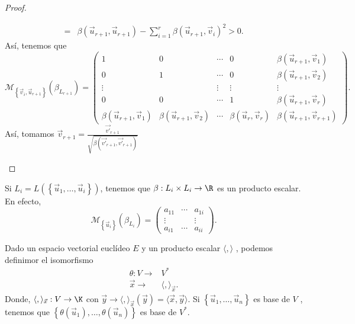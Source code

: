 \begin{proof}
\begin{description}
\[\begin{split}
	= & \beta\left(\vec{u}_{r+1}, \vec{u}_{r+1}\right) - \sum^{r}_{i=1}\beta\left(\vec{u}_{r+1}, \vec{v}_{i}\right)^{2} > 0.
\end{split}
\]
Así, tenemos que 
\[\mathcal{M}_{ \left\{ \vec{v}_{i}, \vec{u}_{r+1}\right\} }\left(\beta_{L_{r+1}}\right) = \begin{pmatrix} 1 & 0 & \cdots & 0 & \beta\left(\vec{u}_{r+1}, \vec{v}_{1}\right) \\
0 & 1 & \cdots & 0 & \beta\left(\vec{u}_{r+1}, \vec{v}_{2}\right) \\
\vdots & & \vdots & \vdots & \vdots \\
0 & 0 & \cdots & 1 & \beta\left(\vec{u}_{r+1}, \vec{v}_{r}\right) \\
\beta\left(\vec{u}_{r+1}, \vec{v}_{1}\right) & \beta\left(\vec{u}_{r+1}, \vec{v}_{2}\right) & \cdots & \beta\left(\vec{u}_{r}, \vec{v}_{r}\right) & \beta\left(\vec{u}_{r+1}, \vec{v}_{r+1}\right)\end{pmatrix} .\]
Así, tomamos $\displaystyle \vec{v}_{r+1} = \frac{\vec{v'}_{r+1}}{\sqrt{\beta\left(\vec{v'}_{r+1}, \vec{v'}_{r+1}\right)}} $ 
\end{description}
\end{proof}
\begin{observation}
\normalfont Si $\displaystyle L_{i} = L\left( \left\{ \vec{u}_{1}, \ldots, \vec{u}_{i}\right\} \right) $, tenemos que $\displaystyle \beta:L_{i} \times L_{i} \to \R $ es un producto escalar. En efecto,
\[\mathcal{M}_{ \left\{ \vec{u}_{i}\right\} }\left(\beta_{L_{i}}\right) = \begin{pmatrix} a_{11} & \cdots & a_{1i} \\
\vdots & & \vdots \\
a_{i1} & \cdots & a_{ii}\end{pmatrix} .\]
\end{observation}
Dado un espacio vectorial euclídeo $\displaystyle E $ y un producto escalar $\displaystyle \langle, \rangle  $ , podemos definimor el isomorfismo
\[
\begin{split}
	\theta : V \to & V^{*} \\
	\vec{x} \to & \langle, \rangle _{\vec{x}}.
\end{split}
\]
Donde, $\displaystyle \langle, \rangle _{\vec{x}} : V \to \K  $ con $\displaystyle \vec{y} \to \langle, \rangle_{\vec{x}}\left(\vec{y}\right) = \langle \vec{x}, \vec{y}\rangle  $. Si $\displaystyle \left\{ \vec{u}_{1}, \ldots, \vec{u}_{n}\right\}  $ es base de $\displaystyle V $ , tenemos que $\displaystyle \left\{ \theta\left(\vec{u}_{1}\right), \ldots, \theta\left(\vec{u}_{n}\right)\right\}  $ es base de $\displaystyle V^{*} $.
